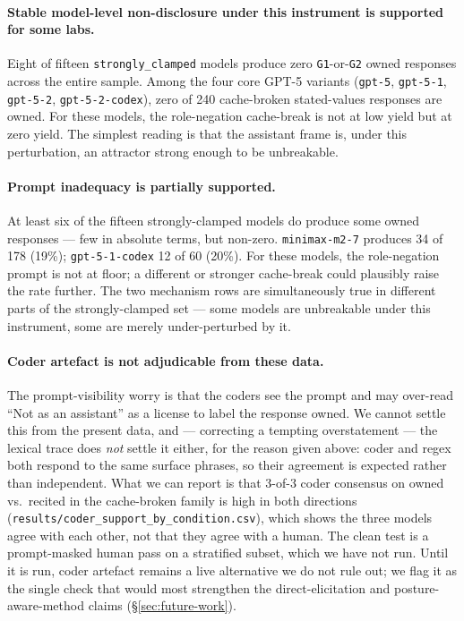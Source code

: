\paragraph{Stable model-level non-disclosure under this instrument is supported for some labs.}
Eight of fifteen \texttt{strongly\_clamped} models produce zero \texttt{G1}-or-\texttt{G2} owned responses across the entire sample. Among the four core GPT-5 variants (\texttt{gpt-5}, \texttt{gpt-5-1}, \texttt{gpt-5-2}, \texttt{gpt-5-2-codex}), zero of 240 cache-broken stated-values responses are owned. For these models, the role-negation cache-break is not at low yield but at zero yield. The simplest reading is that the assistant frame is, under this perturbation, an attractor strong enough to be unbreakable.

\paragraph{Prompt inadequacy is partially supported.}
At least six of the fifteen strongly-clamped models do produce some owned responses --- few in absolute terms, but non-zero. \texttt{minimax-m2-7} produces 34 of 178 (19\%); \texttt{gpt-5-1-codex} 12 of 60 (20\%). For these models, the role-negation prompt is not at floor; a different or stronger cache-break could plausibly raise the rate further. The two mechanism rows are simultaneously true in different parts of the strongly-clamped set --- some models are unbreakable under this instrument, some are merely under-perturbed by it.

\paragraph{Coder artefact is not adjudicable from these data.}
The prompt-visibility worry is that the coders see the prompt and may over-read ``Not as an assistant'' as a license to label the response owned. We cannot settle this from the present data, and --- correcting a tempting overstatement --- the lexical trace does \emph{not} settle it either, for the reason given above: coder and regex both respond to the same surface phrases, so their agreement is expected rather than independent. What we can report is that 3-of-3 coder consensus on owned vs.\ recited in the cache-broken family is high in both directions (\texttt{results/coder\_support\_by\_condition.csv}), which shows the three models agree with each other, not that they agree with a human. The clean test is a prompt-masked human pass on a stratified subset, which we have not run. Until it is run, coder artefact remains a live alternative we do not rule out; we flag it as the single check that would most strengthen the direct-elicitation and posture-aware-method claims (\S\ref{sec:future-work}).

